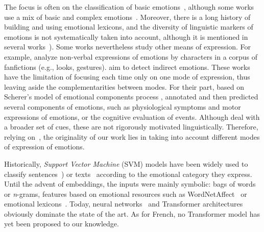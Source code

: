 The focus is often on the classification of basic emotions~\citep{strapparava_semeval-2007_2007,mohammad_emotional_2012,abdaoui_feel_2017,demszky_goemotions_2020,ohman_xed_2020,bianchi_feel-it_2021}, although some works use a mix of basic and complex emotions~\citep{balahur_detecting_2012,fraisse_utiliser_2015,abdaoui_feel_2017,mohammad_semeval-2018_2018,liu_dens_2019,demszky_goemotions_2020}.
%
Moreover, there is a long history of building and using emotional lexicons, and the diversity of linguistic markers of emotions is not systematically taken into account, although it is mentioned in several works~\citep{alm_emotions_2005,mohammad_emotional_2012,kim_who_2018,demszky_goemotions_2020}). Some works nevertheless study other means of expression. For example, \citet{kim_analysis_2019} analyze non-verbal expressions of emotions by characters in a corpus of fanfictions (e.g., looks, gestures). \citet{balahur_detecting_2012} aim to detect indirect emotions. These works have the limitation of focusing each time only on one mode of expression, thus leaving aside the complementarities between modes. For their part, based on Scherer's model of emotional components process \citeyearpar{scherer_what_2005}, \citet{casel-etal-2021-emotion} annotated and then predicted several components of emotions, such as physiological symptoms and motor expressions of emotions, or the cognitive evaluation of events. Although \citep{casel-etal-2021-emotion} deal with a broader set of cues, these are not rigorously motivated linguistically. Therefore, relying on~\citep{etienne_psycho-linguistically_2022}, the originality of our work lies in taking into account different modes of expression of emotions.

Historically, \textit{Support Vector Machine} (SVM) models have been widely used to classify sentences~\citep{aman_identifying_2007,mohammad_emotional_2012}) or texts~\citep{abdaoui_feel_2017,balahur_detecting_2012,fraisse_utiliser_2015,mohammad_emotional_2012} according to the emotional category they express. Until the advent of embeddings, the inputs were mainly symbolic: bags of words or \textit{n}-grams, features based on emotional resources such as WordNetAffect~\citep{aman_identifying_2007,balahur_detecting_2012, strapparava_semeval-2007_2007} or emotional lexicons~\citep{strapparava_semeval-2007_2007,abdaoui_feel_2017,kim_who_2018}.
%
Today, neural networks~\citep{kim_who_2018} and Transformer architectures~\citep{liu_dens_2019,demszky_goemotions_2020,ohman_xed_2020,bianchi_feel-it_2021} obviously dominate the state of the art. As for French, no Transformer model has yet been proposed to our knowledge.




